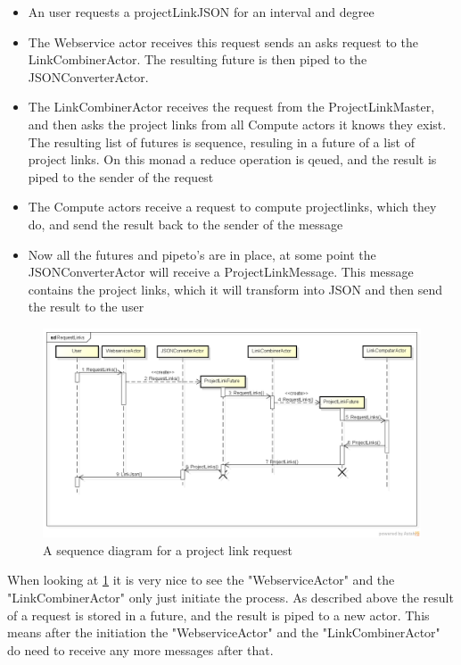 \documentclass[10pt,a4paper]{article}
\begin{document}
\begin{itemize}
	\item{An user requests a projectLinkJSON for an interval and degree}
	\item{The Webservice actor receives this request sends an asks request to the LinkCombinerActor. The resulting future is then piped to the JSONConverterActor.}
	\item{The LinkCombinerActor receives the request from the ProjectLinkMaster, and then asks the project links from all Compute actors it knows they exist. The resulting list of futures is sequence, resuling in a future of a list of project links. On this monad a reduce operation is qeued, and the result is piped to the sender of the request}
	\item{The Compute actors receive a request to compute projectlinks, which they do, and send the result back to the sender of the message}
	\item{Now all the futures and pipeto's are in place, at some point the JSONConverterActor will receive a ProjectLinkMessage. This message contains the project links, which it will transform into JSON and then send the result to the user}
\end{itemize}

\begin{figure}[htb]
    \centering
    \includegraphics[width=1.0\textwidth]{RequestLinks}
    \caption{A sequence diagram for a project link request}
    \label{fig:actor_seq}
\end{figure}



When looking at \ref{fig:actor_seq} it is very nice to see the "WebserviceActor" and the "LinkCombinerActor" only just initiate the process. As described above the result of a request is stored in a future, and the result is piped to a new actor. This means after the initiation the "WebserviceActor" and the "LinkCombinerActor" do need to receive any more messages after that.
\end{document}
